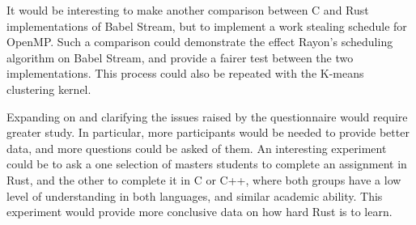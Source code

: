 It would be interesting to make another comparison between C and Rust implementations of Babel Stream, but to implement a work stealing schedule for OpenMP\@. Such a comparison could demonstrate the effect Rayon's scheduling algorithm on Babel Stream, and provide a fairer test between the two implementations. This process could also be repeated with the K-means clustering kernel. 

Expanding on and clarifying the issues raised by the questionnaire would require greater study. In particular, more participants would be needed to provide better data, and more questions could be asked of them. An interesting experiment could be to ask a one selection of masters students to complete an assignment in Rust, and the other to complete it in C or C++, where both groups have a low level of understanding in both languages, and similar academic ability. This experiment would provide more conclusive data on how hard Rust is to learn.
